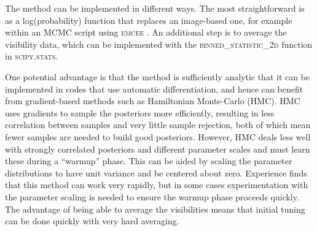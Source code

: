 \documentclass[fleqn,usenatbib]{mnras}
\begin{document}
The method can be implemented in different ways. The most straightforward is as a log(probability) function that replaces an image-based one, for example within an MCMC script using \textsc{emcee} \citep{2013PASP..125..306F}. An additional step is to average the visibility data, which can be implemented with the \textsc{binned\_statistic\_2d} function in \textsc{scipy.stats}.

One potential advantage is that the method is sufficiently analytic that it can be implemented in codes that use automatic differentiation, and hence can benefit from gradient-based methods such as Hamiltonian Monte-Carlo (HMC). HMC uses gradients to sample the posteriors more efficiently, resulting in less correlation between samples and very little sample rejection, both of which mean fewer samples are needed to build good posteriors. However, HMC deals less well with strongly correlated posteriors and different parameter scales and must learn these during a ``warmup'' phase. This can be aided by scaling the parameter distributions to have unit variance and be centered about zero. Experience finds that this method can work very rapidly, but in some cases experimentation with the parameter scaling is needed to ensure the warmup phase proceeds quickly. The advantage of being able to average the visibilities means that initial tuning can be done quickly with very hard averaging.

\bsp	%
\label{lastpage}
\end{document}
